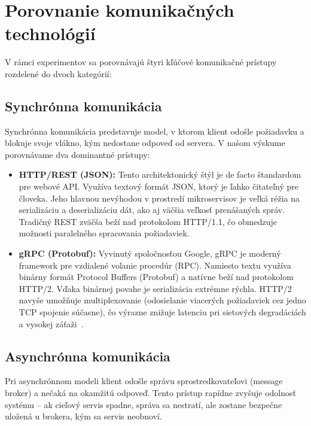 \section{Porovnanie komunikačných technológií} \label{s: protokoly}

V rámci experimentov sa porovnávajú štyri kľúčové komunikačné prístupy rozdelené do dvoch kategórií:

\subsection{Synchrónna komunikácia} \label{s: synchro}
Synchrónna komunikácia predstavuje model, v ktorom klient odošle požiadavku a blokuje svoje vlákno, kým nedostane odpoveď od servera. V našom výskume porovnávame dva dominantné prístupy:

\begin{itemize}
\item \textbf{HTTP/REST (JSON):} Tento architektonický štýl je de facto štandardom pre webové API. Využíva textový formát JSON, ktorý je ľahko čitateľný pre človeka. Jeho hlavnou nevýhodou v prostredí mikroservisov je veľká réžia na serializáciu a deserializáciu dát, ako aj väčšia veľkosť prenášaných správ. Tradičný REST zväčša beží nad protokolom HTTP/1.1, čo obmedzuje možnosti paralelného spracovania požiadaviek.
\item \textbf{gRPC (Protobuf):} Vyvinutý spoločnosťou Google, gRPC je moderný framework pre vzdialené volanie procedúr (RPC). Namiesto textu využíva binárny formát Protocol Buffers (Protobuf) a natívne beží nad protokolom HTTP/2. Vďaka binárnej povahe je serializácia extrémne rýchla. HTTP/2 navyše umožňuje multiplexovanie (odosielanie viacerých požiadaviek cez jedno TCP spojenie súčasne), čo výrazne znižuje latenciu pri sietových degradáciách a vysokej záťaži~\cite{Indrasiri2020}.
\end{itemize}

\subsection{Asynchrónna komunikácia} \label{s: asynchro}
Pri asynchrónnom modeli klient odošle správu sprostredkovateľovi (message broker) a nečaká na okamžitú odpoveď. Tento prístup rapídne zvyšuje odolnosť systému – ak cieľový servis spadne, správa sa nestratí, ale zostane bezpečne uložená u brokera, kým sa servis neobnoví.

